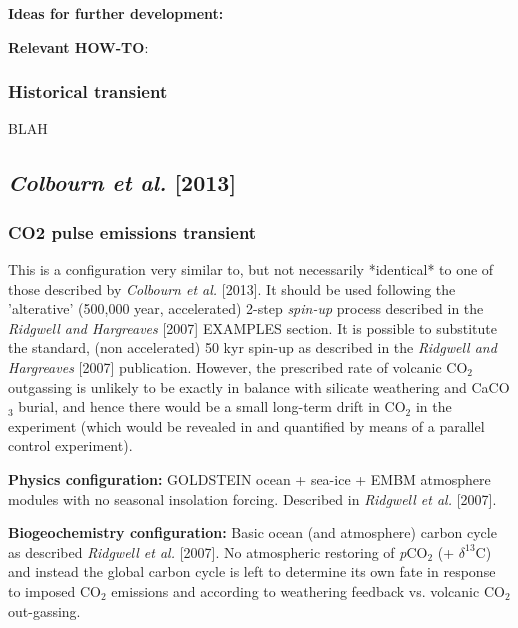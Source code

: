 \documentclass[10pt,twoside]{article}
\begin{document}
\noindent \textbf{Ideas for further development:} 

\noindent \textbf{Relevant HOW-TO}:


\subsubsection{Historical transient}\label{EXAMPLE.worjh2.Caoetal2009.historical}

BLAH


\subsection{\textit{Colbourn et al.} [2013]}

\subsubsection{CO2 pulse emissions transient}\label{EXAMPLE.worbe2.Colbournetal2013.EMISSIONS}

This is a configuration very similar to, but not necessarily *identical* to one of those described by \textit{Colbourn et al.} [2013]. It should be used following the 'alterative' (500,000 year, accelerated) 2-step \textit{spin-up} process described in the \textit{Ridgwell and Hargreaves} [2007] EXAMPLES section. It is possible to substitute the standard, (non accelerated) 50 kyr spin-up as described in the \textit{Ridgwell and Hargreaves} [2007] publication. However, the prescribed rate of volcanic CO$_{2}$ outgassing is unlikely to be exactly in balance with silicate weathering and CaCO\(_{3}\) burial, and hence there would be a small long-term drift in CO$_{2}$  in the experiment (which would be revealed in  and quantified by means of a parallel control experiment). 

\noindent \textbf{Physics configuration:} GOLDSTEIN ocean + sea-ice + EMBM atmosphere modules with no seasonal insolation forcing. Described in \textit{Ridgwell et al.} [2007].

\noindent \textbf{Biogeochemistry configuration:} Basic ocean (and atmosphere) carbon cycle as described \textit{Ridgwell et al.} [2007]. No atmospheric restoring of \textit{p}CO$_{2}$ (+ $\delta^{13}$C) and instead the global carbon cycle is left to determine its own fate in response to imposed CO$_{2}$ emissions and according to weathering feedback vs. volcanic CO$_{2}$ out-gassing.
\end{document}
